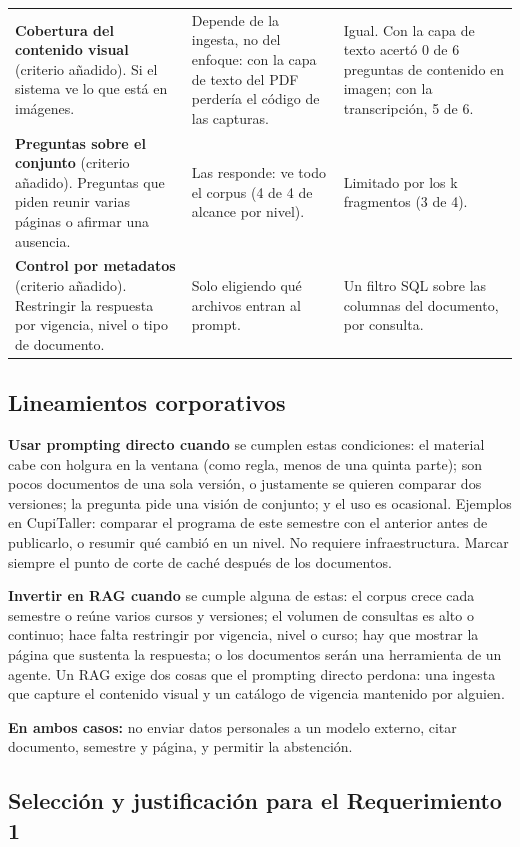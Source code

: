 \documentclass[11pt,letterpaper]{article}
\begin{document}
\begin{table}[H]
\begin{tabularx}{\textwidth}{>{\raggedright\arraybackslash}p{}LL}
\textbf{Cobertura del contenido visual} (criterio añadido). Si el sistema ve lo que está en imágenes. & Depende de la ingesta, no del enfoque: con la capa de texto del PDF perdería el código de las capturas. & Igual. Con la capa de texto acertó 0 de 6 preguntas de contenido en imagen; con la transcripción, 5 de 6. \\
\textbf{Preguntas sobre el conjunto} (criterio añadido). Preguntas que piden reunir varias páginas o afirmar una ausencia. & Las responde: ve todo el corpus (4 de 4 de alcance por nivel). & Limitado por los k fragmentos (3 de 4). \\
\textbf{Control por metadatos} (criterio añadido). Restringir la respuesta por vigencia, nivel o tipo de documento. & Solo eligiendo qué archivos entran al prompt. & Un filtro SQL sobre las columnas del documento, por consulta. \\
\bottomrule
\end{tabularx}
\end{table}

\subsection{Lineamientos corporativos}

\textbf{Usar prompting directo cuando} se cumplen estas condiciones: el material cabe con holgura en la ventana (como regla, menos de una quinta parte); son pocos documentos de una sola versión, o justamente se quieren comparar dos versiones; la pregunta pide una visión de conjunto; y el uso es ocasional. Ejemplos en CupiTaller: comparar el programa de este semestre con el anterior antes de publicarlo, o resumir qué cambió en un nivel. No requiere infraestructura. Marcar siempre el punto de corte de caché después de los documentos.

\textbf{Invertir en RAG cuando} se cumple alguna de estas: el corpus crece cada semestre o reúne varios cursos y versiones; el volumen de consultas es alto o continuo; hace falta restringir por vigencia, nivel o curso; hay que mostrar la página que sustenta la respuesta; o los documentos serán una herramienta de un agente. Un RAG exige dos cosas que el prompting directo perdona: una ingesta que capture el contenido visual y un catálogo de vigencia mantenido por alguien.

\textbf{En ambos casos:} no enviar datos personales a un modelo externo, citar documento, semestre y página, y permitir la abstención.

\subsection{Selección y justificación para el Requerimiento 1}
\end{document}
